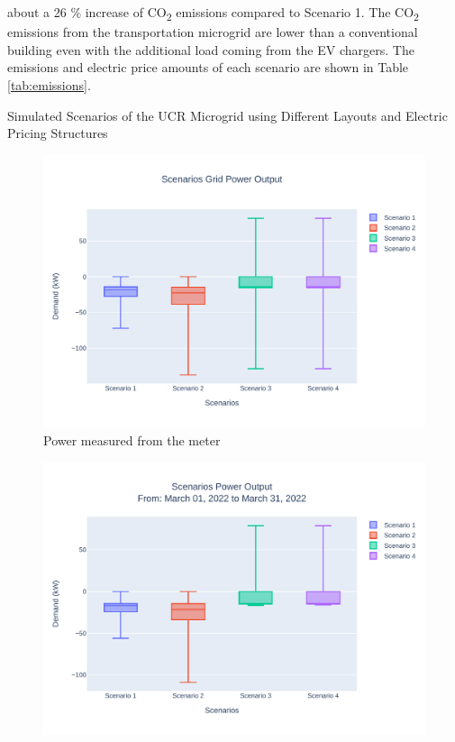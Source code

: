 \documentclass[conference]{IEEEtran}
\begin{document}
about a 26 \% increase of CO\textsubscript{2} emissions compared to Scenario 1. The CO\textsubscript{2} emissions from the transportation microgrid are lower than a conventional building even with the additional load coming from the EV chargers. The emissions and electric price amounts of each scenario are shown in Table \ref{tab:emissions}.
	\begin{table}[H]
		\caption{Simulated Scenarios of the UCR Microgrid using Different Layouts and Electric Pricing Structures}
		\tiny
		
		\normalsize
		\label{tab:scenarios}
	\end{table}
	
	\begin{figure}[H]
		\centering
		\includegraphics[width=0.9\linewidth]{Fig/scenarios_power_output_boxplot}
		\caption{Power measured from the meter}
		\label{fig:scenariospoweroutputboxplot}
	\end{figure}
	
	\begin{figure}[H]
		\centering
		\includegraphics[width=1\linewidth]{Fig/0_Scn_Output_Run_2_Mar_01_2022_to_Mar_31_2022}
		\caption{}
		\label{fig:0scnoutputrun2mar012022tomar312022}
	\end{figure}
\end{document}

